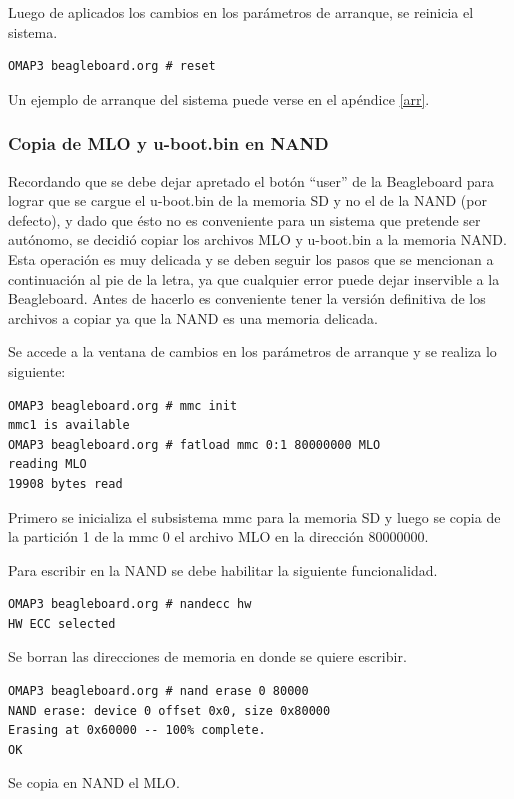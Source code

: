 Luego de aplicados los cambios en los parámetros de arranque, se reinicia el sistema.

\begin{verbatim}
OMAP3 beagleboard.org # reset 
\end{verbatim}

Un ejemplo de arranque del sistema puede verse en el apéndice \ref{arr}.

\subsubsection{Copia de MLO y u-boot.bin en NAND}

Recordando que se debe dejar apretado el botón “user” de la Beagleboard para lograr que se cargue el u-boot.bin de la memoria SD y no el de la NAND (por defecto), y dado que ésto no es conveniente para un sistema que pretende ser autónomo, se decidió copiar los archivos MLO y u-boot.bin a la memoria NAND. Esta operación es muy delicada y se deben seguir los pasos que se mencionan a continuación al pie de la letra, ya que cualquier error puede dejar inservible a la Beagleboard. Antes de hacerlo es conveniente tener la versión definitiva de los archivos a copiar ya que la NAND es una memoria delicada.

\bigskip
Se accede a la ventana de cambios en los parámetros de arranque y se realiza lo siguiente:

\begin{verbatim}
OMAP3 beagleboard.org # mmc init 
mmc1 is available 
OMAP3 beagleboard.org # fatload mmc 0:1 80000000 MLO 
reading MLO 
19908 bytes read 
\end{verbatim}

Primero se inicializa el subsistema mmc para la memoria SD y luego se copia de la partición 1 de la mmc 0 el archivo MLO en la dirección 80000000.

\bigskip
Para escribir en la NAND se debe habilitar la siguiente funcionalidad.
\begin{verbatim}
OMAP3 beagleboard.org # nandecc hw 
HW ECC selected 
\end{verbatim}

Se borran las direcciones de memoria en donde se quiere escribir.
\begin{verbatim}
OMAP3 beagleboard.org # nand erase 0 80000 
NAND erase: device 0 offset 0x0, size 0x80000 
Erasing at 0x60000 -- 100% complete. 
OK 
\end{verbatim}

Se copia en NAND el MLO.

